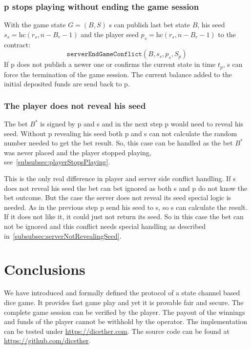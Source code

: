\documentclass[oneside]{amsart}
\begin{document}
\begin{multicols}{2}
\subsubsection{\Gls{p} stops playing without ending the game session}
With the game state $G = (B,S)$ \gls{s} can publish last bet state $B$, his seed $s_s=\text{hc}(r_s, n - B_r - 1)$
and the player seed $p_s=\text{hc}(r_s, n - B_r - 1)$ to the contract:
\begin{equation}
    \texttt{serverEndGameConflict}(B, s_s, p_s, S_p)
\end{equation}
If \gls{p} does not publish a newer one or confirms the current state in time $t_p$, \gls{s} can force the termination
of the game session.
The current balance added to the initial deposited funds are send back to \gls{p}.

\subsubsection{The player does not reveal his seed}
The bet $B^*$ is signed by \gls{p} and \gls{s} and in the next step \gls{p} would need to reveal his seed.
Without \gls{p} revealing his seed both \gls{p} and \gls{s} can not calculate the random number needed to get the bet result.
So, this case can be handled as the bet $B^*$ was never placed and the player stopped playing, see~\autoref{subsubsec:playerStopsPlaying}.

This is the only real difference in player and server side conflict handling.
If \gls{s} does not reveal his seed the bet can bet ignored as both \gls{s} and \gls{p} do not know the bet outcome.
But the case the server does not reveal its seed special logic is needed.
As in the previous step \gls{p} send his seed to \gls{s}, so \gls{s} can calculate the result.
If it does not like it, it could just not return its seed.
So in this case the bet can not be ignored and this conflict needs special handling as described in~\autoref{subsubsec:serverNotRevealingSeed}.

\section{Conclusions}\label{sec:sumary}
We have introduced and formally defined the protocol of a state channel based dice game.
It provides fast game play and yet it is provable fair and secure.
The complete game session can be verified by the player.
The payout of the winnings and funds of the player cannot be withhold by the operator.
The implementation can be tested under \url{https://dicether.com}.
The source code can be found at \url{https://github.com/dicether}.

\printbibliography
\end{multicols}
\end{document}

